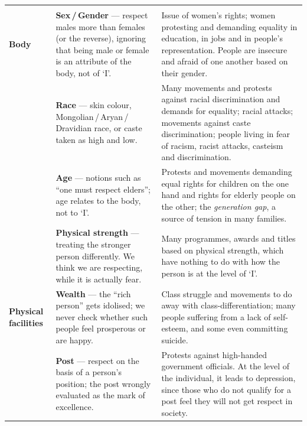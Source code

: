 \renewcommand{\arraystretch}{1.3}
\begin{longtable}{P{22mm} P{60mm} P{65mm}}
 &  &
   \\ \hline \endfirsthead
{} &  &
   \\ \hline \endhead
\textbf{Body} & \textbf{Sex\,/\,Gender} --- respect males more than females
  (or the reverse), ignoring that being male or female is an attribute of the
  body, not of `I'. &
  Issue of women's rights; women protesting and demanding equality in
  education, in jobs and in people's representation. People are insecure and
  afraid of one another based on their gender. \\ \hline
 & \textbf{Race} --- skin colour, Mongolian\,/\,Aryan\,/\,Dravidian race, or
  caste taken as high and low. &
  Many movements and protests against racial discrimination and demands for
  equality; racial attacks; movements against caste discrimination; people
  living in fear of racism, racist attacks, casteism and discrimination.
  \\ \hline
 & \textbf{Age} --- notions such as ``one must respect elders''; age relates
  to the body, not to `I'. &
  Protests and movements demanding equal rights for children on the one hand
  and rights for elderly people on the other; the \emph{generation gap}, a
  source of tension in many families. \\ \hline
 & \textbf{Physical strength} --- treating the stronger person differently. We
  think we are respecting, while it is actually fear. &
  Many programmes, awards and titles based on physical strength, which have
  nothing to do with how the person is at the level of `I'. \\ \hline
\textbf{Physical facilities} & \textbf{Wealth} --- the ``rich person'' gets
  idolised; we never check whether such people feel prosperous or are happy. &
  Class struggle and movements to do away with class-differentiation; many
  people suffering from a lack of self-esteem, and some even committing
  suicide. \\ \hline
 & \textbf{Post} --- respect on the basis of a person's position; the post
  wrongly evaluated as the mark of excellence. &
  Protests against high-handed government officials. At the level of the
  individual, it leads to depression, since those who do not qualify for a
  post feel they will not get respect in society. \\ \hline

\end{longtable}
